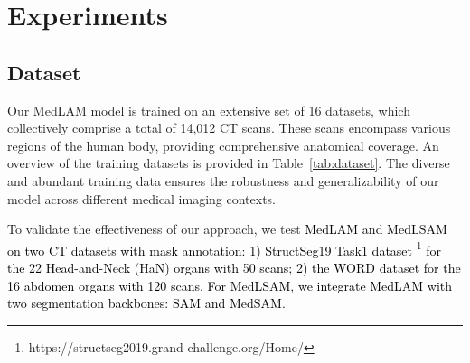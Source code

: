 \documentclass[times,twocolumn,final]{elsarticle}
\begin{document}
\section{Experiments}

\subsection{Dataset}
\par Our MedLAM model is trained on an extensive set of 16 datasets, which collectively comprise a total of 14,012 CT scans. These scans encompass various regions of the human body, providing comprehensive anatomical coverage. An overview of the training datasets is provided in Table~\ref{tab:dataset}. The diverse and abundant training data ensures the robustness and generalizability of our model across different medical imaging contexts.
\par To validate the effectiveness of our approach,  we test \textcolor{black}{MedLAM and MedLSAM on two CT datasets with mask annotation: 1) StructSeg19 Task1 dataset \footnote{https://structseg2019.grand-challenge.org/Home/} for the 22 Head-and-Neck (HaN) organs with 50 scans; 2) the WORD dataset \cite{luo2022word} for the 16 abdomen organs with 120 scans. For MedLSAM, we integrate MedLAM with two segmentation backbones: SAM\cite{kirillov2023segment} and MedSAM\cite{MedSAM}.}


\end{document}
